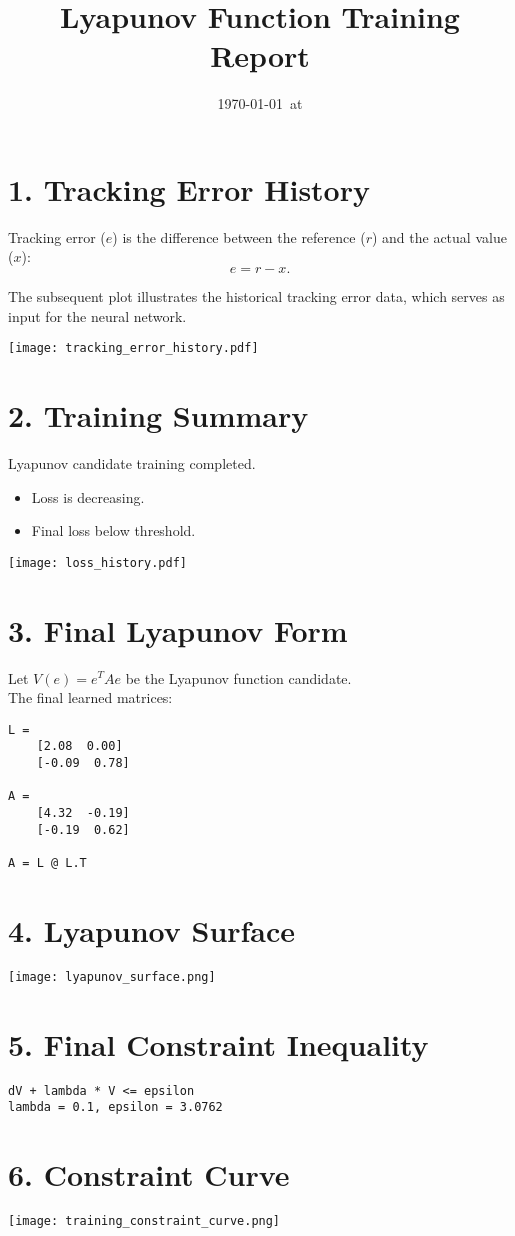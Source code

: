 \documentclass[11pt]{article}
\title{Lyapunov Function Training Report}
\author{}
\date{\today\ at \currenttime}
\begin{document}
\maketitle
\thispagestyle{fancy}

\section*{1. Tracking Error History}
Tracking error ($e$) is the difference between the reference ($r$) and the actual value ($x$):
\begin{equation}
e = r - x.
\end{equation}

\indent The subsequent plot illustrates the historical tracking error data, which serves as input for the neural network.

\begin{center}
\texttt{[image: tracking\_error\_history.pdf]}
\end{center}

\section*{2. Training Summary}
Lyapunov candidate training completed.
\begin{itemize}
  \item  Loss is decreasing.
  \item  Final loss below threshold.
\end{itemize}

\begin{center}
\texttt{[image: loss\_history.pdf]}
\end{center}

\section*{3. Final Lyapunov Form}
Let $V(e) = e^T A e$ be the Lyapunov function candidate. \\
The final learned matrices:
\begin{verbatim}
L = 
    [2.08  0.00]
    [-0.09  0.78]

A = 
    [4.32  -0.19]
    [-0.19  0.62]

A = L @ L.T
\end{verbatim}

\section*{4. Lyapunov Surface}
\texttt{[image: lyapunov\_surface.png]}

\section*{5. Final Constraint Inequality}
\begin{verbatim}
dV + lambda * V <= epsilon
lambda = 0.1, epsilon = 3.0762\end{verbatim}

\section*{6. Constraint Curve}
\texttt{[image: training\_constraint\_curve.png]}
\end{document}

